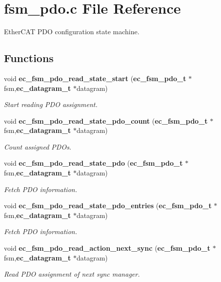 \section{fsm\-\_\-pdo.\-c File Reference}
\label{fsm__pdo_8c}


Ether\-C\-A\-T P\-D\-O configuration state machine.  


\subsection*{Functions}
\begin{DoxyCompactItemize}
\item 
void {\bf ec\-\_\-fsm\-\_\-pdo\-\_\-read\-\_\-state\-\_\-start} ({\bf ec\-\_\-fsm\-\_\-pdo\-\_\-t} $\ast$fsm,{\bf ec\-\_\-datagram\-\_\-t} $\ast$datagram)
\begin{DoxyCompactList}\small\item\em Start reading P\-D\-O assignment. \end{DoxyCompactList}\item 
void {\bf ec\-\_\-fsm\-\_\-pdo\-\_\-read\-\_\-state\-\_\-pdo\-\_\-count} ({\bf ec\-\_\-fsm\-\_\-pdo\-\_\-t} $\ast$fsm,{\bf ec\-\_\-datagram\-\_\-t} $\ast$datagram)
\begin{DoxyCompactList}\small\item\em Count assigned P\-D\-Os. \end{DoxyCompactList}\item 
void {\bf ec\-\_\-fsm\-\_\-pdo\-\_\-read\-\_\-state\-\_\-pdo} ({\bf ec\-\_\-fsm\-\_\-pdo\-\_\-t} $\ast$fsm,{\bf ec\-\_\-datagram\-\_\-t} $\ast$datagram)
\begin{DoxyCompactList}\small\item\em Fetch P\-D\-O information. \end{DoxyCompactList}\item 
void {\bf ec\-\_\-fsm\-\_\-pdo\-\_\-read\-\_\-state\-\_\-pdo\-\_\-entries} ({\bf ec\-\_\-fsm\-\_\-pdo\-\_\-t} $\ast$fsm,{\bf ec\-\_\-datagram\-\_\-t} $\ast$datagram)
\begin{DoxyCompactList}\small\item\em Fetch P\-D\-O information. \end{DoxyCompactList}\item 
void {\bf ec\-\_\-fsm\-\_\-pdo\-\_\-read\-\_\-action\-\_\-next\-\_\-sync} ({\bf ec\-\_\-fsm\-\_\-pdo\-\_\-t} $\ast$fsm,{\bf ec\-\_\-datagram\-\_\-t} $\ast$datagram)
\begin{DoxyCompactList}\small\item\em Read P\-D\-O assignment of next sync manager. \end{DoxyCompactList}\item 

\end{DoxyCompactItemize}

